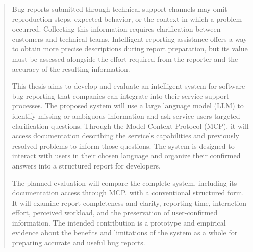 \begin{abstract}

Bug reports submitted through technical support channels may omit reproduction steps, expected behavior, or the context in which a problem occurred. Collecting this information requires clarification between customers and technical teams. Intelligent reporting assistance offers a way to obtain more precise descriptions during report preparation, but its value must be assessed alongside the effort required from the reporter and the accuracy of the resulting information.

This thesis aims to develop and evaluate an intelligent system for software bug reporting that companies can integrate into their service support processes. The proposed system will use a large language model (LLM) to identify missing or ambiguous information and ask service users targeted clarification questions. Through the Model Context Protocol (MCP), it will access documentation describing the service's capabilities and previously resolved problems to inform those questions. The system is designed to interact with users in their chosen language and organize their confirmed answers into a structured report for developers.

The planned evaluation will compare the complete system, including its documentation access through MCP, with a conventional structured form. It will examine report completeness and clarity, reporting time, interaction effort, perceived workload, and the preservation of user-confirmed information. The intended contribution is a prototype and empirical evidence about the benefits and limitations of the system as a whole for preparing accurate and useful bug reports.
\end{abstract}
